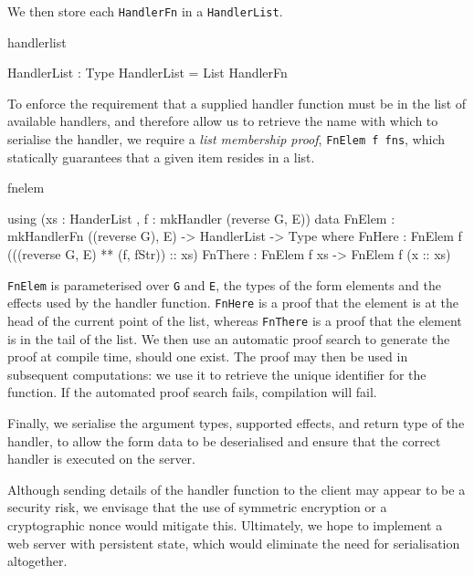 \noindent
We then store each \texttt{HandlerFn} in a \texttt{HandlerList}.

\begin{SaveVerbatim}{handlerlist}

HandlerList : Type
HandlerList = List HandlerFn

\end{SaveVerbatim}

To enforce the requirement that a supplied handler function must be in the
list of available handlers, and therefore allow us to retrieve the name with
which to serialise the handler, we require a \textit{list membership proof},
\texttt{FnElem f fns}, which statically guarantees that a given item resides in
a list.

\begin{SaveVerbatim}{fnelem}

using (xs : HanderList , f : mkHandler (reverse G, E))
  data FnElem : mkHandlerFn ((reverse G), E) -> 
                HandlerList -> Type where
       FnHere  : FnElem f (((reverse G, E) ** 
                                  (f, fStr)) :: xs)
       FnThere : FnElem f xs -> FnElem f (x :: xs)
       
\end{SaveVerbatim}

\noindent
\texttt{FnElem} is parameterised over \texttt{G} and \texttt{E}, the types of the
form elements and the effects used by the handler function. \texttt{FnHere}
is a proof that the element is at the head of the current point of the list,
whereas \texttt{FnThere} is a proof that the element is in the tail of 
the list. 
We then use an automatic proof search to
generate the proof at compile time, should one exist. The proof
may then be used in subsequent computations: we use it to retrieve
the unique identifier for the function. If the automated proof search fails,
compilation will fail.

Finally, we serialise the argument types, supported effects, and return
type of the handler, to allow the form data to be 
deserialised and ensure that the correct handler is executed on the
server. 

Although sending details of the handler function to the client may appear to be
a security risk, we envisage that the use of symmetric encryption or a
cryptographic nonce would mitigate this. Ultimately, we hope to implement a
web server with persistent state, which would eliminate the need for
serialisation altogether.

